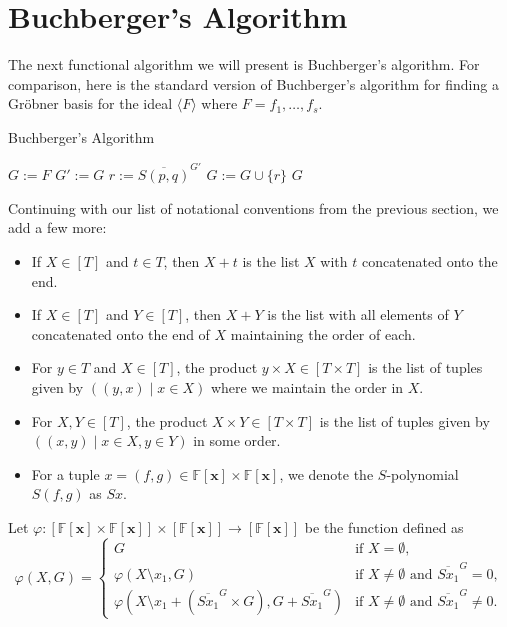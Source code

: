 \documentclass[MS, xcolor=dvipsnames]{wfuthesis}
\def\bF{\mathbb{F}}
\def\and{\text{ and }}
\theoremstyle{definition}
\def\p{\varphi}
\begin{document}
\section{Buchberger's Algorithm}
The next functional algorithm we will present is Buchberger's algorithm. For comparison, here is the standard version of Buchberger's algorithm for finding a Gr\"obner basis for the ideal $\langle F \rangle$ where $F = f_1,\dots,f_s$. \par 
\begin{algorithm}
  \caption{Buchberger's Algorithm}
  \begin{algorithmic}
    \State $G:=F$
    \Repeat
      \State $G' := G$
        \State $r := \overline{S(p,q)}^{G'}$
          \State $G := G \cup \{r\}$
        \EndIf
      \EndFor
    \State \Return $G$
  \end{algorithmic}
\end{algorithm}
Continuing with our list of notational conventions from the previous section, we add a few more:
\begin{itemize}
  \item If $X \in [T]$ and $t \in T$, then $X + t$ is the list $X$ with $t$ concatenated onto the end. 
  \item If $X \in [T]$ and $Y \in [T]$, then $X + Y$ is the list with all elements of $Y$ concatenated onto the end of $X$ maintaining the order of each. 
  \item For $y \in T$ and $X \in [T]$, the product $y \times X \in [T \times T]$ is the list of tuples given by $((y,x) \mid x \in X)$ where we maintain the order in $X$. 
  \item For $X,Y \in [T]$, the product $X \times Y \in [T \times T]$ is the list of tuples given by $((x,y) \mid x \in X, y \in Y)$ in some order. 
  \item For a tuple $x = (f,g) \in \bF[\mathbf x] \times \bF[\mathbf x]$, we denote the $S$-polynomial $S(f,g)$ as $Sx$. 
\end{itemize}
Let $\p: [\bF[\mathbf x] \times \bF[\mathbf x]] \times [\bF[\mathbf x]] \to [\bF[\mathbf x]]$ be the function defined as 
\[ \p(X,G) = \begin{cases} G &\text{if } X = \emptyset, \\ \p(X \setminus x_1,G) &\text{if } X \ne \emptyset \and \overline{Sx_1}^{G} = 0, \\ \p\left(X \setminus x_1 + (\overline{Sx_1}^{G} \times G),G + \overline{Sx_1}^{G}\right) &\text{if } X \ne \emptyset \and \overline{Sx_1}^{G} \ne 0. \end{cases} \]
\end{document}
